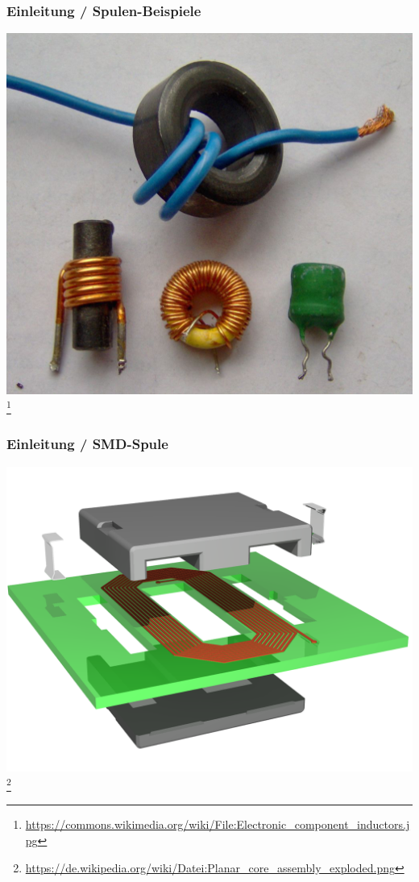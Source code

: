 \begin{frame}
    \frametitle{Einleitung / Spulen-Beispiele}

    \begin{center}
        \includegraphics[height=0.8\textheight]{e06/Spule.jpg}
        \footnote{\tiny \url{https://commons.wikimedia.org/wiki/File:Electronic_component_inductors.jpg}}
    \end{center}
 	
\end{frame}

\begin{frame}
    \frametitle{Einleitung / SMD-Spule}

    \begin{center}
        \includegraphics[height=0.8\textheight]{e06/smd-Spule.png}
        \footnote{\tiny \url{https://de.wikipedia.org/wiki/Datei:Planar_core_assembly_exploded.png}}
    \end{center}
 	
\end{frame}

